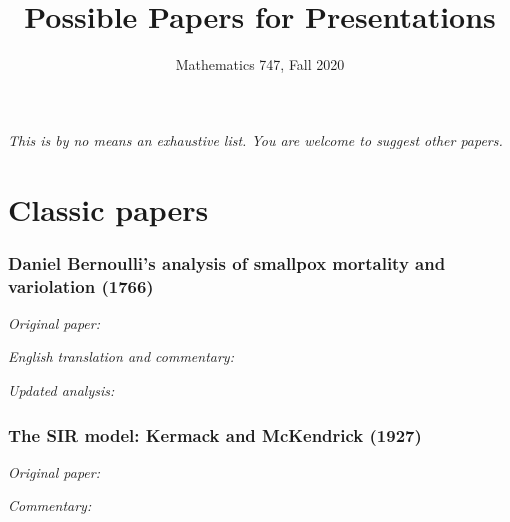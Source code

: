 \documentclass[12pt]{article}
\title{Possible Papers for Presentations}
\author{Mathematics 747, Fall 2020}
\begin{document}
\maketitle

\emph{This is by no means an exhaustive list.  You are welcome to suggest other papers.}

\section*{Classic papers}

\subsubsection*{Daniel Bernoulli's analysis of smallpox mortality and variolation (1766)}

\emph{Original paper:}\\

\emph{English translation and commentary:}\\

\emph{Updated analysis:}\\

\subsubsection*{The SIR model: Kermack and McKendrick (1927)}

\emph{Original paper:}\\

\emph{Commentary:}\\



\end{document}
